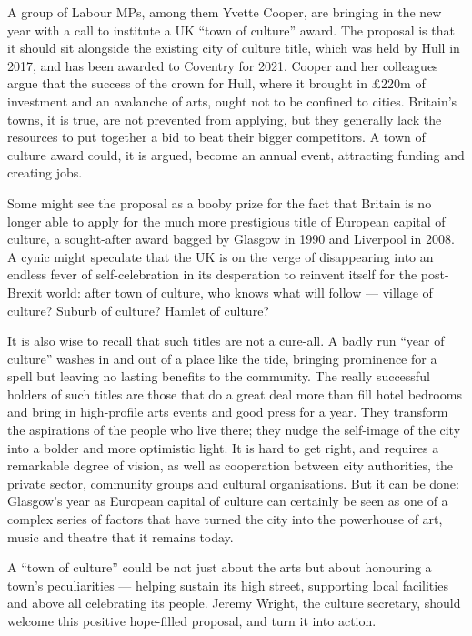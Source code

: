 \documentclass[UTF8,11pt]{ctexart}
\begin{document}
A group of Labour MPs, among them Yvette Cooper, are bringing in the new year with a call to institute a UK “town of culture” award. The proposal is that it should sit alongside the existing city of culture title, which was held by Hull in 2017, and has been awarded to Coventry for 2021. Cooper and her colleagues argue that the success of the crown for Hull, where it brought in £220m of investment and an avalanche of arts, ought not to be confined to cities. Britain’s towns, it is true, are not prevented from applying, but they generally lack the resources to put together a bid to beat their bigger competitors. A town of culture award could, it is argued, become an annual event, attracting funding and creating jobs.


Some might see the proposal as a booby prize for the fact that Britain is no longer able to apply for the much more prestigious title of European capital of culture, a sought-after award bagged by Glasgow in 1990 and Liverpool in 2008. A cynic might speculate that the UK is on the verge of disappearing into an endless fever of self-celebration in its desperation to reinvent itself for the post-Brexit world: after town of culture, who knows what will follow — village of culture? Suburb of culture? Hamlet of culture?


It is also wise to recall that such titles are not a cure-all. A badly run “year of culture” washes in and out of a place like the tide, bringing prominence for a spell but leaving no lasting benefits to the community. The really successful holders of such titles are those that do a great deal more than fill hotel bedrooms and bring in high-profile arts events and good press for a year. They transform the aspirations of the people who live there; they nudge the self-image of the city into a bolder and more optimistic light. It is hard to get right, and requires a remarkable degree of vision, as well as cooperation between city authorities, the private sector, community groups and cultural organisations. But it can be done: Glasgow’s year as European capital of culture can certainly be seen as one of a complex series of factors that have turned the city into the powerhouse of art, music and theatre that it remains today.


A “town of culture” could be not just about the arts but about honouring a town’s peculiarities — helping sustain its high street, supporting local facilities and above all celebrating its people. Jeremy Wright, the culture secretary, should welcome this positive hope-filled proposal, and turn it into action.
\end{document}
